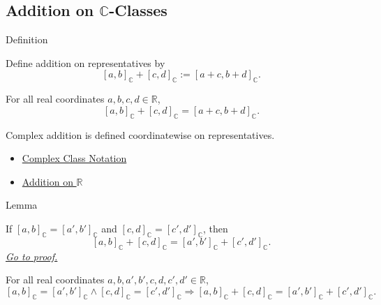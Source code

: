 \subsection*{\texorpdfstring{Addition on $\mathbb{C}$-Classes}{Addition on C-Classes}}

\begin{definitionbox}{Definition}
\begin{definition}
\label{def:addition-on-c-classes}
Define addition on representatives by
\[
[a,b]_{\mathbb{C}}+[c,d]_{\mathbb{C}}
:=[a+c,b+d]_{\mathbb{C}}.
\]
\end{definition}
\end{definitionbox}


\begin{remark*}
For all real coordinates $a,b,c,d\in\mathbb{R}$,
\[
[a,b]_{\mathbb{C}}+[c,d]_{\mathbb{C}}
=[a+c,b+d]_{\mathbb{C}}.
\]
\end{remark*}

\begin{remark*}[Interpretation]
Complex addition is defined coordinatewise on representatives.
\end{remark*}

\begin{dependencies}
\begin{itemize}
  \item \hyperref[def:complex-class-notation]{Complex Class Notation}
  \item \hyperref[def:addition-on-r]{Addition on $\mathbb{R}$}
\end{itemize}
\end{dependencies}

\begin{lemmabox}{Lemma}
\begin{lemma}
\label{lem:addition-on-c-respects-equivalence}
If $[a,b]_{\mathbb{C}}=[a',b']_{\mathbb{C}}$ and
$[c,d]_{\mathbb{C}}=[c',d']_{\mathbb{C}}$, then
\[
[a,b]_{\mathbb{C}}+[c,d]_{\mathbb{C}}
=
[a',b']_{\mathbb{C}}+[c',d']_{\mathbb{C}}.
\]
\hyperref[prf:addition-on-c-respects-equivalence]{\textit{Go to proof.}}
\end{lemma}
\end{lemmabox}

\begin{remark*}
For all real coordinates $a,b,a',b',c,d,c',d'\in\mathbb{R}$,
\[
[a,b]_{\mathbb{C}}=[a',b']_{\mathbb{C}}
\land
[c,d]_{\mathbb{C}}=[c',d']_{\mathbb{C}}
\Longrightarrow
[a,b]_{\mathbb{C}}+[c,d]_{\mathbb{C}}
=
[a',b']_{\mathbb{C}}+[c',d']_{\mathbb{C}}.
\]
\end{remark*}

